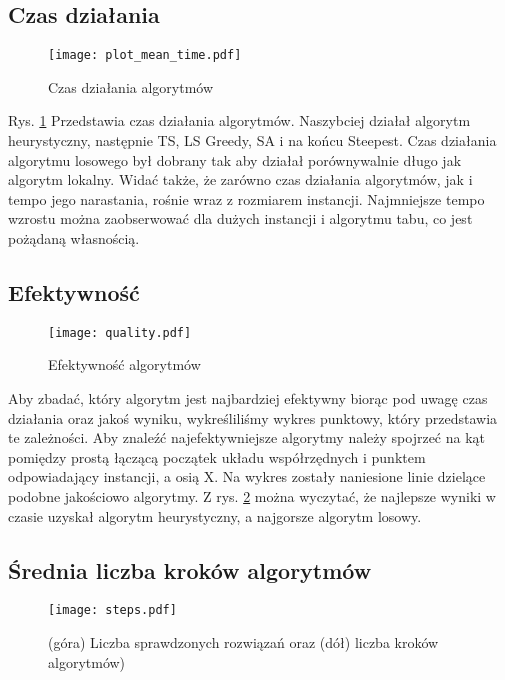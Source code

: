 \documentclass{article}
\begin{document}
\subsection{Czas działania}

\begin{figure}[H]
\begin{center}
    \texttt{[image: plot\_mean\_time.pdf]}
\end{center}
\caption{Czas działania algorytmów}
\label{fig:plot_time}
\end{figure}

Rys. \ref{fig:plot_time} Przedstawia czas działania algorytmów. Naszybciej działał algorytm heurystyczny, następnie TS, LS Greedy, SA i na końcu Steepest. Czas działania algorytmu losowego był dobrany tak aby działał porównywalnie długo jak algorytm lokalny. Widać także, że zarówno czas działania algorytmów, jak i tempo jego narastania, rośnie wraz z rozmiarem instancji. Najmniejsze tempo wzrostu można zaobserwować dla dużych instancji i algorytmu tabu, co jest pożądaną własnością.


\subsection{Efektywność}


\begin{figure}[H]
\begin{center}
\texttt{[image: quality.pdf]}
\end{center}
\caption{Efektywność algorytmów}
\label{fig:plot_quality}
\end{figure}

Aby zbadać, który algorytm jest najbardziej efektywny biorąc pod uwagę czas działania oraz jakoś wyniku, wykreśliliśmy wykres punktowy, który przedstawia te zależności. Aby znaleźć najefektywniejsze algorytmy należy spojrzeć na kąt pomiędzy prostą łączącą początek układu współrzędnych i punktem odpowiadający instancji, a osią X. Na wykres zostały naniesione linie dzielące podobne jakościowo algorytmy. Z rys. \ref{fig:plot_quality} można wyczytać, że najlepsze wyniki w czasie uzyskał algorytm heurystyczny, a najgorsze algorytm losowy.


\subsection{Średnia liczba kroków algorytmów}

\begin{figure} 
\begin{center}
    \texttt{[image: steps.pdf]}
\end{center}
\caption{(góra) Liczba sprawdzonych rozwiązań oraz (dół) liczba kroków algorytmów)}
\label{fig:plot_steps}
\end{figure}
\end{document}
